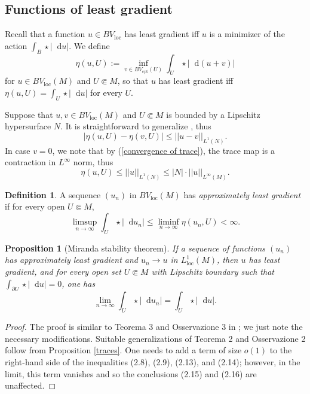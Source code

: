 \documentclass[reqno,10pt]{amsart}
\newcommand*\dif{\mathop{}\!\mathrm{d}}
\newcommand{\dfn}[1]{\emph{#1}\index{#1}}
\newcommand{\loc}{\mathrm{loc}}
\newcommand{\cpt}{\mathrm{cpt}}
\newtheorem{proposition}[theorem]{Proposition}
\theoremstyle{definition}
\newtheorem{definition}[theorem]{Definition}
\numberwithin{equation}{section}
\begin{document}

\subsection{Functions of least gradient}\label{LeastGradientFunctions}
Recall that a function $u \in BV_\loc$ has least gradient iff $u$ is a minimizer of the action $\int_B \star |\dif u|$.
We define
$$\eta(u, U) := \inf_{v \in BV_\cpt(U)} \int_U \star |\dif(u + v)|$$
for $u \in BV_\loc(M)$ and $U \Subset M$, so that $u$ has least gradient iff $\eta(u, U) = \int_U \star |\dif u|$ for every $U$.

Suppose that $u, v \in BV_\loc(M)$ and $U \Subset M$ is bounded by a Lipschitz hypersurface $N$. It is straightforward to generalize \cite[Lemma 5.6]{Giusti77}, thus
\begin{equation}
|\eta(u, U) - \eta(v, U)| \leq ||u - v||_{L^1(N)}. \label{a priori estimate 1}
\end{equation}
In case $v = 0$, we note that by (\ref{convergence of trace}), the trace map is a contraction in $L^\infty$ norm, thus
\begin{equation}
\eta(u, U) \leq ||u||_{L^1(N)} \leq |N| \cdot ||u||_{L^\infty(M)}. \label{a priori estimate 2}
\end{equation}

\begin{definition}
A sequence $(u_n)$ in $BV_\loc(M)$ has \dfn{approximately least gradient} if for every open $U \Subset M$,
$$\limsup_{n \to \infty} \int_U \star |\dif u_n| \leq \liminf_{n \to \infty} \eta(u_n, U) < \infty.$$
\end{definition}

\begin{proposition}[Miranda stability theorem]\label{Miranda convergence}
If a sequence of functions $(u_n)$ has approximately least gradient and $u_n \to u$ in $L^1_\loc(M)$, then $u$ has least gradient, and for every open set $U \Subset M$ with Lipschitz boundary such that $\int_{\partial U} \star |\dif u| = 0$, one has
\begin{equation}\label{convergence in total variation}
\lim_{n \to \infty} \int_U \star |\dif u_n| = \int_U \star |\dif u|.
\end{equation}
\end{proposition}
\begin{proof}
The proof is similar to Teorema 3 and Osservazione 3 in \cite{Miranda67}; we just note the necessary modifications.
Suitable generalizations of Teorema 2 and Osservazione 2 follow from Proposition \ref{traces}.
One needs to add a term of size $o(1)$ to the right-hand side of the inequalities (2.8), (2.9), (2.13), and (2.14); however, in the limit, this term vanishes and so the conclusions (2.15) and (2.16) are unaffected.
\end{proof}
\end{document}
